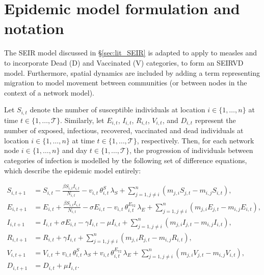 \section{Epidemic model formulation and notation}
\label{meth:MeaslesCompa}
The SEIR model discussed in \S \ref{sec:lit_SEIR} is adapted to apply to measles and to incorporate Dead (D) and Vaccinated (V) categories, to form an SEIRVD model. Furthermore, spatial dynamics are included by adding a term representing migration to model movement between communities (or between nodes in the context of a network model). 

Let $S_{i,t}$ denote the number of susceptible individuals at location $i \in \{1,\dots,n \}$ at time $t \in \{1,\dots, \mathcal{T} \}$. Similarly, let $E_{i,t}$, $I_{i,t}$, $R_{i,t}$, $V_{i,t}$, and $D_{i,t}$ represent the number of exposed, infectious, recovered, vaccinated and dead individuals at location $i \in \{1,\dots,n \}$ at time $t \in \{1,\dots, \mathcal{T} \}$, respectively. Then, for each network node $i \in \{1, \dots, n\}$ and day $t \in \{1, \dots,\mathcal{T}\}$, the progression of individuals between categories of infection is modelled by the following set of difference equations, which describe the epidemic model entirely:

\begin{align}
S_{i,t+1} &= S_{i,t} - \frac{\beta S_{i,t} I_{i,t}}{N_{i,t}} - v_{i,t} \, \theta^{S}_{i,t} \, \lambda_{S} + \sum_{j=1, j \neq i}^{n} (m_{j,i} S_{j,t} - m_{i,j} S_{i,t}),       \\
E_{i,t+1} &= E_{i,t} + \frac{\beta S_{i,t} I_{i,t}}{N_{i,t}} - \sigma E_{i,t} -  v_{i,t} \, \theta^{E_{72}}_{i,t} \, \lambda_{E} + \sum_{j=1, j \neq i}^{n} (m_{j,i} E_{j,t} - m_{i,j} E_{i,t}), \\
I_{i,t+1} &= I_{i,t} + \sigma E_{i,t} - \gamma I_{i,t} - \mu I_{i,t} + \sum_{j=1, j \neq i}^{n} (m_{j,i} I_{j,t} - m_{i,j} I_{i,t}),   \\
R_{i,t+1} &= R_{i,t} + \gamma I_{i,t} + \sum_{j=1, j \neq i}^{n} (m_{j,i} R_{j,t} - m_{i,j} R_{i,t}),  \\
V_{i,t+1} &= V_{i,t} + v_{i,t} \, \theta^{S}_{i,t} \, \lambda_{S} + v_{i,t} \, \theta^{E_{72}}_{i,t} \, \lambda_{E} + \sum_{j=1, j \neq i}^{n} (m_{j,i} V_{j,t} - m_{i,j} V_{i,t}), \\
D_{i,t+1} &= D_{i,t} + \mu I_{i,t}.
\end{align}

